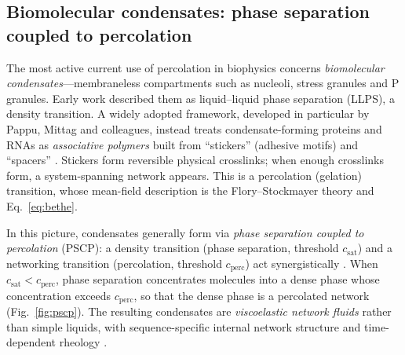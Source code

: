 \documentclass[11pt]{article}
\begin{document}
\subsection{Biomolecular condensates: phase separation coupled to percolation}

The most active current use of percolation in biophysics concerns \emph{biomolecular condensates}---membraneless compartments such as nucleoli, stress granules and P granules. Early work described them as liquid--liquid phase separation (LLPS), a density transition. A widely adopted framework, developed in particular by Pappu, Mittag and colleagues, instead treats condensate-forming proteins and RNAs as \emph{associative polymers} built from ``stickers'' (adhesive motifs) and ``spacers'' \cite{Choi2020}. Stickers form reversible physical crosslinks; when enough crosslinks form, a system-spanning network appears. This is a percolation (gelation) transition, whose mean-field description is the Flory--Stockmayer theory and Eq.~\eqref{eq:bethe}.

In this picture, condensates generally form via \emph{phase separation coupled to percolation} (PSCP): a density transition (phase separation, threshold $c_{\text{sat}}$) and a networking transition (percolation, threshold $c_{\text{perc}}$) act synergistically \cite{MittagPappu2022}. When $c_{\text{sat}}<c_{\text{perc}}$, phase separation concentrates molecules into a dense phase whose concentration exceeds $c_{\text{perc}}$, so that the dense phase is a percolated network (Fig.~\ref{fig:pscp}). The resulting condensates are \emph{viscoelastic network fluids} rather than simple liquids, with sequence-specific internal network structure and time-dependent rheology \cite{MittagPappu2022}.
\end{document}

